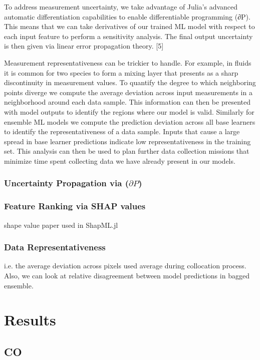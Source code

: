 To address measurement uncertainty, we take advantage of Julia’s advanced automatic differentiation capabilities to enable differentiable programming (∂P). This means that we can take derivatives of our trained ML model with respect to each input feature to perform a sensitivity analysis. The final output uncertainty is then given via linear error propagation theory. [5]

Measurement representativeness can be trickier to handle. For example, in fluids it is common for two species to form a mixing layer that presents as a sharp discontinuity in measurement values. To quantify the degree to which neighboring points diverge we compute the average deviation across input measurements in a neighborhood around each data sample. This information can then be presented with model outputs to identify the regions where our model is valid. Similarly for ensemble ML models we compute the prediction deviation across all base learners to identify the representativeness of a data sample. Inputs that cause a large spread in base learner predictions indicate low representativeness in the training set. This analysis can then be used to plan further data collection missions that minimize time spent collecting data we have already present in our models. 

\subsubsection{Uncertainty Propagation via ($\partial P$)}

\subsubsection{Feature Ranking via SHAP values}

shape value paper used in ShapML.jl \cite{SHAPvalues1}

\subsubsection{Data Representativeness}
i.e. the average deviation across pixels used average during collocation process.
Also, we can look at relative disagreement between model predictions in bagged ensemble. 

\section{Results}
\subsection{CO}

